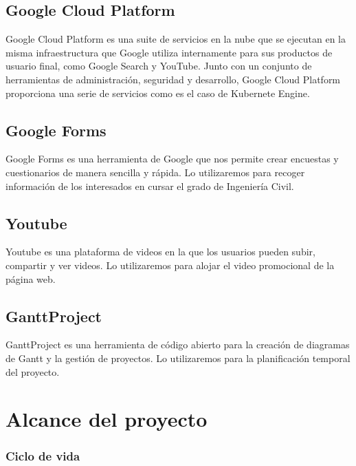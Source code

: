 \documentclass{report}
\begin{document}
        \section*{Google Cloud Platform}
            Google Cloud Platform es una suite de servicios en la nube que se ejecutan en la misma infraestructura que Google utiliza internamente para sus productos de usuario final, como Google Search y YouTube. Junto con un conjunto de herramientas de administración, seguridad y desarrollo, Google Cloud Platform proporciona una serie de servicios como es el caso de Kubernete Engine.
        \section*{Google Forms}
            Google Forms es una herramienta de Google que nos permite crear encuestas y cuestionarios de manera sencilla y rápida. Lo utilizaremos para recoger información de los interesados en cursar el grado de Ingeniería Civil.
        \section*{Youtube}
            Youtube es una plataforma de videos en la que los usuarios pueden subir, compartir y ver videos. Lo utilizaremos para alojar el video promocional de la página web.
        \section*{GanttProject}
            GanttProject es una herramienta de código abierto para la creación de diagramas de Gantt y la gestión de proyectos. Lo utilizaremos para la planificación temporal del proyecto.
    \chapter{Alcance del proyecto} %
            \subsection{Ciclo de vida}
\end{document}
